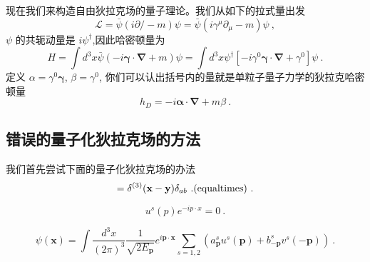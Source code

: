 
现在我们来构造自由狄拉克场的量子理论。我们从如下的拉式量出发
\begin{equation}
\mathcal L = \bar \psi (i \partial\!\!\!/ - m)\psi = \bar \psi (i \gamma^\mu \partial_\mu - m)\psi~,
\end{equation}
$\psi$ 的共轭动量是 $i\psi^\dagger$,因此哈密顿量为
\begin{equation}
H = \int d^3 x \bar \psi (-i \boldsymbol \gamma \cdot \boldsymbol \nabla + m)\psi = \int d^3 x \psi^\dagger [-i\gamma^0\boldsymbol\gamma \cdot \boldsymbol\nabla + \gamma^0]\psi ~.
\end{equation}
定义 $\alpha = \gamma^0 \boldsymbol\gamma$, $\beta = \gamma^0$, 你们可以认出括号内的量就是单粒子量子力学的狄拉克哈密顿量
\begin{equation}
h_D = - i \boldsymbol\alpha \cdot \boldsymbol \nabla + m \beta ~.
\end{equation} 

\subsection{错误的量子化狄拉克场的方法}
我们首先尝试下面的量子化狄拉克场的办法
\begin{equation}
[\psi_a(\mathbf x),\psi_b^\dagger(\mathbf y)] = \delta^{(3)}(\mathbf x - \mathbf y)\delta_{ab}~. {\rm (equal times)}~.
\end{equation}

\begin{equation}
[i\gamma^0\partial_0+i\boldsymbol \gamma \cdot \nabla - m ] u^s (p) e^{-ip\cdot x} = 0~.
\end{equation}

\begin{equation}
\psi(\mathbf x)= \int \frac{d^3 x}{(2\pi)^3} \frac{1}{\sqrt{2 E_{\mathbf p}}} e^{i \mathbf p \cdot \mathbf x} \sum_{s = 1,2} (a_{\mathbf p}^s u^s(\mathbf p)+ b_{-\mathbf p}^s v^s(-\mathbf p))~.
\end{equation}
